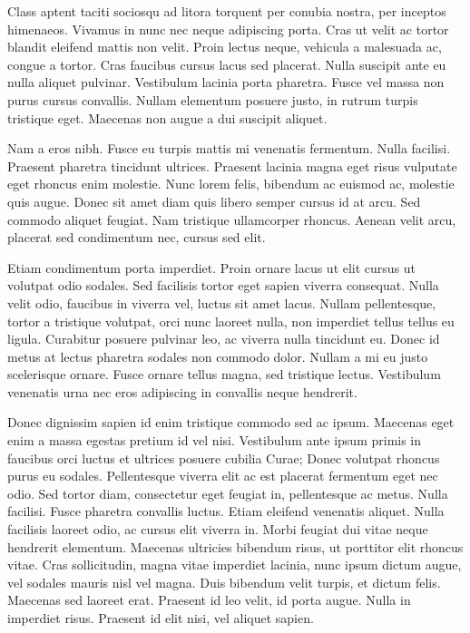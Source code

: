 Class aptent taciti sociosqu ad litora torquent per conubia nostra, per inceptos himenaeos.
Vivamus in nunc nec neque adipiscing porta.
Cras ut velit ac tortor blandit eleifend mattis non velit.
Proin lectus neque, vehicula a malesuada ac, congue a tortor.
Cras faucibus cursus lacus sed placerat.
Nulla suscipit ante eu nulla aliquet pulvinar.
Vestibulum lacinia porta pharetra.
Fusce vel massa non purus cursus convallis.
Nullam elementum posuere justo, in rutrum turpis tristique eget.
Maecenas non augue a dui suscipit aliquet.

Nam a eros nibh.
Fusce eu turpis mattis mi venenatis fermentum.
Nulla facilisi.
Praesent pharetra tincidunt ultrices.
Praesent lacinia magna eget risus vulputate eget rhoncus enim molestie.
Nunc lorem felis, bibendum ac euismod ac, molestie quis augue.
Donec sit amet diam quis libero semper cursus id at arcu.
Sed commodo aliquet feugiat.
Nam tristique ullamcorper rhoncus.
Aenean velit arcu, placerat sed condimentum nec, cursus sed elit.

Etiam condimentum porta imperdiet.
Proin ornare lacus ut elit cursus ut volutpat odio sodales.
Sed facilisis tortor eget sapien viverra consequat.
Nulla velit odio, faucibus in viverra vel, luctus sit amet lacus.
Nullam pellentesque, tortor a tristique volutpat, orci nunc laoreet nulla, non imperdiet tellus tellus eu ligula.
Curabitur posuere pulvinar leo, ac viverra nulla tincidunt eu.
Donec id metus at lectus pharetra sodales non commodo dolor.
Nullam a mi eu justo scelerisque ornare.
Fusce ornare tellus magna, sed tristique lectus.
Vestibulum venenatis urna nec eros adipiscing in convallis neque hendrerit.

Donec dignissim sapien id enim tristique commodo sed ac ipsum.
Maecenas eget enim a massa egestas pretium id vel nisi.
Vestibulum ante ipsum primis in faucibus orci luctus et ultrices posuere cubilia Curae; Donec volutpat rhoncus purus eu sodales.
Pellentesque viverra elit ac est placerat fermentum eget nec odio.
Sed tortor diam, consectetur eget feugiat in, pellentesque ac metus.
Nulla facilisi.
Fusce pharetra convallis luctus.
Etiam eleifend venenatis aliquet.
Nulla facilisis laoreet odio, ac cursus elit viverra in.
Morbi feugiat dui vitae neque hendrerit elementum.
Maecenas ultricies bibendum risus, ut porttitor elit rhoncus vitae.
Cras sollicitudin, magna vitae imperdiet lacinia, nunc ipsum dictum augue, vel sodales mauris nisl vel magna.
Duis bibendum velit turpis, et dictum felis.
Maecenas sed laoreet erat.
Praesent id leo velit, id porta augue.
Nulla in imperdiet risus.
Praesent id elit nisi, vel aliquet sapien.


